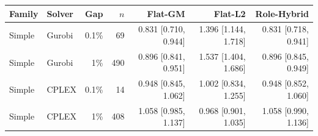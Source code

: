 \begin{tabular}{llrrrrr}
\toprule
Family & Solver & Gap & $n$ & Flat-GM & Flat-L2 & Role-Hybrid \\
\midrule
Simple & Gurobi & 0.1\% & 69 & 0.831 [0.710, 0.944] & 1.396 [1.144, 1.718] & 0.831 [0.718, 0.941] \\
Simple & Gurobi & 1\% & 490 & 0.896 [0.841, 0.951] & 1.537 [1.404, 1.686] & 0.896 [0.845, 0.949] \\
Simple & CPLEX & 0.1\% & 14 & 0.948 [0.845, 1.062] & 1.002 [0.834, 1.255] & 0.948 [0.852, 1.060] \\
Simple & CPLEX & 1\% & 408 & 1.058 [0.985, 1.137] & 0.968 [0.901, 1.035] & 1.058 [0.990, 1.136] \\
\bottomrule
\end{tabular}
